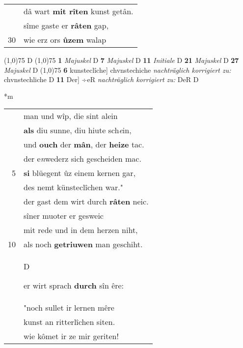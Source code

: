 \documentclass[8pt,a4paper,notitlepage]{article}
\begin{document}
\begin{table}[ht]
\begin{minipage}[t]{0.5\linewidth}
\begin{tabular}{rl}
 & dâ wart \textbf{mit rîten} kunst getân.\\ 
 & sîme gaste er \textbf{râten} gap,\\ 
30 & wie erz ors \textbf{ûzem} walap\\ 
\end{tabular}
\scriptsize
\line(1,0){75} \newline
D \newline
\line(1,0){75} \newline
\textbf{1} \textit{Majuskel} D  \textbf{7} \textit{Majuskel} D  \textbf{11} \textit{Initiale} D  \textbf{21} \textit{Majuskel} D  \textbf{27} \textit{Majuskel} D  \newline
\line(1,0){75} \newline
\textbf{6} kunsteclîche] chvnstechiche \textit{nachträglich korrigiert zu:} chvnstechliche D \textbf{11} Der] ÷eR \textit{nachträglich korrigiert zu:} DeR D \newline
\end{minipage}
\hspace{0.5cm}
\begin{minipage}[t]{0.5\linewidth}
\small
\begin{center}*m
\end{center}
\begin{tabular}{rl}
 & man und wîp, die sint alein\\ 
 & \textbf{als} diu sunne, diu hiute sch\textit{e}in,\\ 
 & und \textbf{ouch} der \textbf{mân}, der \textbf{heize} tac.\\ 
 & der e\textit{n}wederz sich gescheiden mac.\\ 
5 & \textbf{si} blüegent ûz einem kernen gar,\\ 
 & des nemt künsteclîchen war."\\ 
 & der gast dem wirt durch \textbf{râten} neic.\\ 
 & sîner muoter er gesweic\\ 
 & mit rede und in dem herzen niht,\\ 
10 & als noch \textbf{getriuwen} man geschiht.\\ 
 & \begin{large}D\end{large}er wirt sprach \textbf{durch} sîn êre:\\ 
 & "noch sullet ir lernen mêre\\ 
 & kunst an ritterlîchen siten.\\ 
 & wie kômet ir ze mir geriten!\\ 

\end{tabular}
\end{minipage}
\end{table}
\end{document}
